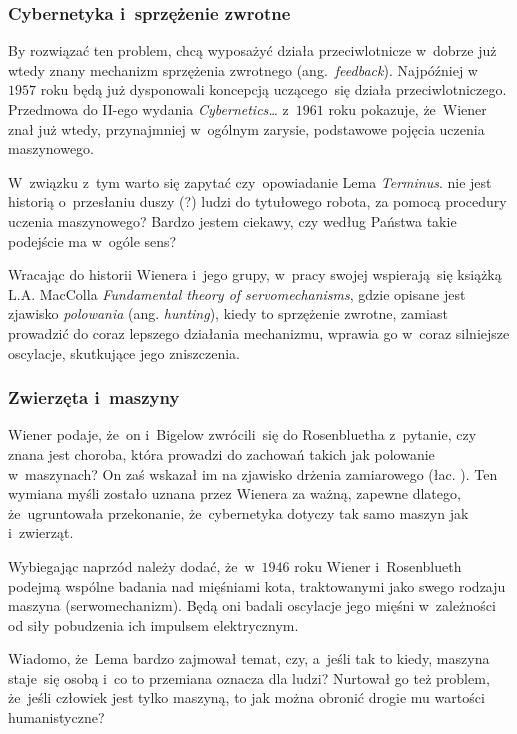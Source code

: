 \documentclass[10pt,t]{beamer}
\begin{document}
\begin{frame}
  \frametitle{Cybernetyka i~sprzężenie zwrotne}


  By rozwiązać ten problem, chcą wyposażyć działa przeciwlotnicze
  w~dobrze już wtedy znany
  mechanizm sprzężenia zwrotnego (ang.~\textit{feedback}). Najpóźniej
  w~$1957$ roku będą już dysponowali koncepcją uczącego~się działa
  przeciwlotniczego. Przedmowa do II-ego wydania \textit{Cybernetics\ldots}
  z~$1961$ roku pokazuje, że~Wiener znał już wtedy, przynajmniej w~ogólnym
  zarysie, podstawowe pojęcia uczenia maszynowego.

  W~związku z~tym warto się zapytać czy~opowiadanie Lema \textit{Terminus}.
  nie jest historią o~przesłaniu duszy (?) ludzi do tytułowego robota, za
  pomocą procedury uczenia maszynowego? Bardzo jestem ciekawy, czy według
  Państwa takie podejście ma w~ogóle sens?

  Wracając do historii Wienera i~jego grupy, w~pracy swojej wspierają~się
  książką L.A. MacColla
  {\textit{Fundamental theory of servomechanisms}}, gdzie opisane jest
  zjawisko \textit{polowania} (ang. \textit{hunting}), kiedy to
  sprzężenie zwrotne, zamiast prowadzić do coraz lepszego działania
  mechanizmu, wprawia go w~coraz silniejsze oscylacje, skutkujące jego
  zniszczenia.

\end{frame}





\begin{frame}
  \frametitle{Zwierzęta i~maszyny}


  Wiener podaje, że~on i~Bigelow zwrócili~się do Rosenbluetha z~pytanie, czy
  znana jest choroba, która prowadzi do zachowań takich jak polowanie
  w~maszynach? On zaś wskazał im na zjawisko drżenia zamiarowego
  (łac.
  ). Ten wymiana myśli zostało uznana przez Wienera za
  ważną, zapewne dlatego, że~ugruntowała przekonanie, że~cybernetyka dotyczy
  tak samo maszyn jak i~zwierząt.

  Wybiegając naprzód należy dodać, że~w~$1946$ roku Wiener i~Rosenblueth
  podejmą wspólne badania nad mięśniami kota, traktowanymi jako swego
  rodzaju maszyna (serwomechanizm). Będą oni badali oscylacje jego mięśni
  w~zależności od siły pobudzenia ich impulsem elektrycznym.

  Wiadomo, że~Lema bardzo zajmował temat, czy, a~jeśli tak to kiedy,
  maszyna staje~się osobą i~co to przemiana oznacza dla ludzi? Nurtował go
  też problem, że~jeśli człowiek jest tylko maszyną, to jak można obronić
  drogie mu wartości humanistyczne?

\end{frame}
\end{document}

